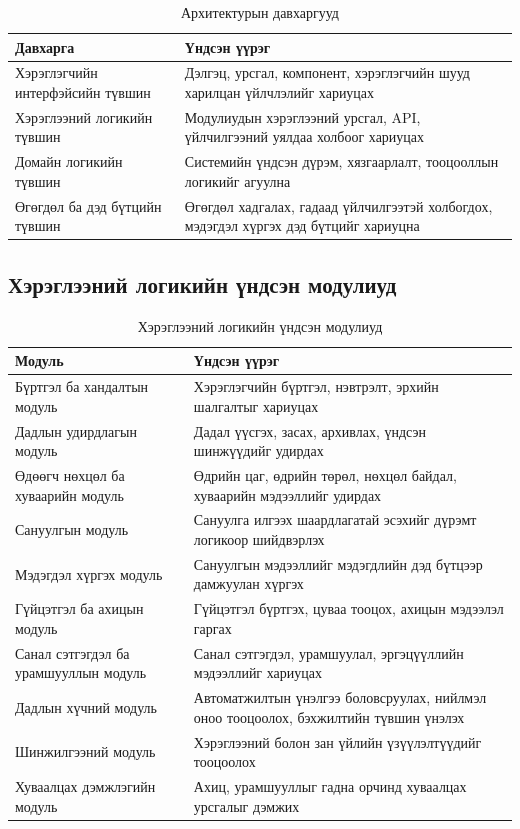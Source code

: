 \begin{table}[htbp]
\centering
\small
\setlength{\tabcolsep}{4pt}
\begin{tabular}{|L{4.1cm}|L{8.9cm}|}
\hline
\textbf{Давхарга} & \textbf{Үндсэн үүрэг} \\
\hline
Хэрэглэгчийн интерфэйсийн түвшин & Дэлгэц, урсгал, компонент, хэрэглэгчийн шууд харилцан үйлчлэлийг хариуцах \\
\hline
Хэрэглээний логикийн түвшин & Модулиудын хэрэглээний урсгал, API, үйлчилгээний уялдаа холбоог хариуцах \\
\hline
Домайн логикийн түвшин & Системийн үндсэн дүрэм, хязгаарлалт, тооцооллын логикийг агуулна \\
\hline
Өгөгдөл ба дэд бүтцийн түвшин & Өгөгдөл хадгалах, гадаад үйлчилгээтэй холбогдох, мэдэгдэл хүргэх дэд бүтцийг хариуцна \\
\hline
\end{tabular}
\caption{Архитектурын давхаргууд}
\end{table}

\subsection{Хэрэглээний логикийн үндсэн модулиуд}

\begin{table}[htbp]
\centering
\small
\setlength{\tabcolsep}{4pt}
\begin{tabular}{|L{4.2cm}|L{8.8cm}|}
\hline
\textbf{Модуль} & \textbf{Үндсэн үүрэг} \\
\hline
Бүртгэл ба хандалтын модуль & Хэрэглэгчийн бүртгэл, нэвтрэлт, эрхийн шалгалтыг хариуцах \\
\hline
Дадлын удирдлагын модуль & Дадал үүсгэх, засах, архивлах, үндсэн шинжүүдийг удирдах \\
\hline
Өдөөгч нөхцөл ба хуваарийн модуль & Өдрийн цаг, өдрийн төрөл, нөхцөл байдал, хуваарийн мэдээллийг удирдах \\
\hline
Сануулгын модуль & Сануулга илгээх шаардлагатай эсэхийг дүрэмт логикоор шийдвэрлэх \\
\hline
Мэдэгдэл хүргэх модуль & Сануулгын мэдээллийг мэдэгдлийн дэд бүтцээр дамжуулан хүргэх \\
\hline
Гүйцэтгэл ба ахицын модуль & Гүйцэтгэл бүртгэх, цуваа тооцох, ахицын мэдээлэл гаргах \\
\hline
Санал сэтгэгдэл ба урамшууллын модуль & Санал сэтгэгдэл, урамшуулал, эргэцүүллийн мэдээллийг хариуцах \\
\hline
Дадлын хүчний модуль & Автоматжилтын үнэлгээ боловсруулах, нийлмэл оноо тооцоолох, бэхжилтийн түвшин үнэлэх \\
\hline
Шинжилгээний модуль & Хэрэглээний болон зан үйлийн үзүүлэлтүүдийг тооцоолох \\
\hline
Хуваалцах дэмжлэгийн модуль & Ахиц, урамшууллыг гадна орчинд хуваалцах урсгалыг дэмжих \\
\hline
\end{tabular}
\caption{Хэрэглээний логикийн үндсэн модулиуд}
\end{table}

